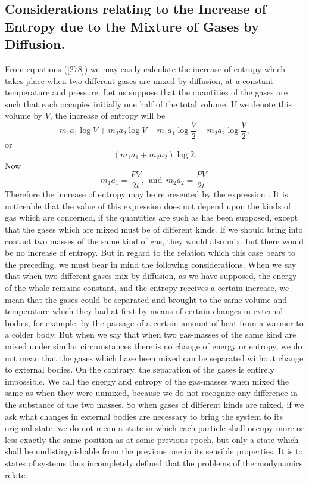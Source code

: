 \documentclass[12pt]{article}
\begin{document}
\subsection{Considerations relating to the Increase of Entropy due to the
Mixture of Gases by Diffusion.}

From  equations (\ref{278}) we may easily calculate the increase of entropy which takes place when two different gases are mixed by diffusion, at a constant temperature and pressure. Let us suppose that the quantities of the gases are such that each occupies initially one half of the total volume. If we denote this volume by $V$, the increase of entropy will be
 $$m_1 a_1 \log V+ m_2 a_2 \log V- m_1 a_1 \log \frac{V}{2} - m_2 a_2 \log \frac{V}{2},$$
or                   $$ (m_1 a_1 +m_2 a_2) \log 2.$$
Now               
$$m_1 a_1=\frac{PV}{2t}, \ \ \text{and} \ \  m_2 a_2=\frac{PV}{2t}.$$
Therefore the increase of entropy may be represented by the expression
\eqs {}  .       \label{297}\eqe
It is noticeable that the value of this expression does not depend upon the kinds of gas which are concerned, if the quantities are such as has been supposed, except that the gases which are mixed must be of different kinds. If we should bring into contact two masses of the same kind of gas, they would also mix, but there would be no increase of entropy. But in regard to the relation which this case bears to the preceding, we must bear in mind the following considerations. When we say that when two different gases mix by diffusion, as we have supposed, the energy of the whole remains constant, and the entropy receives a certain increase, we mean that the gases could be separated and brought to the same volume and temperature which they had at first by means of certain changes in external bodies, for example, by the passage of a certain amount of heat from a warmer to a colder body. But when we say that when two gas-masses of the same kind are mixed under similar circumstances there is no change of energy or entropy, we do not mean that the gases which have been mixed can be separated without change to external bodies. On the contrary, the separation of the gases is entirely impossible. We call the energy and entropy of the gas-masses when mixed the same as when they were unmixed, because we do not recognize any difference in the substance of the two masses. So when gases of different kinds are mixed, if we ask what changes in external bodies are necessary to bring the system to its original state, we do not mean a state in which each particle shall occupy more or less exactly the same position as at some previous epoch, but only a state which shall be undistinguishable from the previous one in its sensible properties. It is to states of systems thus incompletely defined that the problems of thermodynamics relate.
\end{document}
